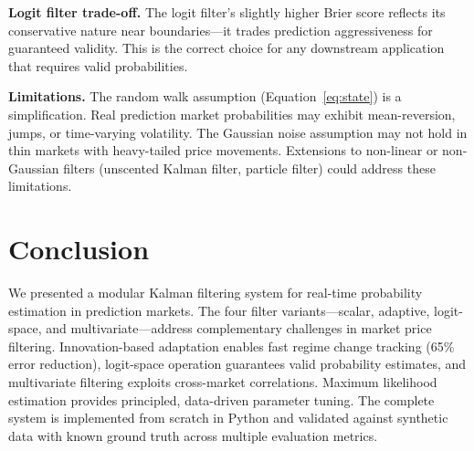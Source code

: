 \documentclass[11pt, a4paper]{article}
\begin{document}
\textbf{Logit filter trade-off.} The logit filter's slightly higher Brier score reflects its conservative nature near boundaries---it trades prediction aggressiveness for guaranteed validity. This is the correct choice for any downstream application that requires valid probabilities.

\textbf{Limitations.} The random walk assumption (Equation~\ref{eq:state}) is a simplification. Real prediction market probabilities may exhibit mean-reversion, jumps, or time-varying volatility. The Gaussian noise assumption may not hold in thin markets with heavy-tailed price movements. Extensions to non-linear or non-Gaussian filters (unscented Kalman filter, particle filter) could address these limitations.

\section{Conclusion}

We presented a modular Kalman filtering system for real-time probability estimation in prediction markets. The four filter variants---scalar, adaptive, logit-space, and multivariate---address complementary challenges in market price filtering. Innovation-based adaptation enables fast regime change tracking (65\% error reduction), logit-space operation guarantees valid probability estimates, and multivariate filtering exploits cross-market correlations. Maximum likelihood estimation provides principled, data-driven parameter tuning. The complete system is implemented from scratch in Python and validated against synthetic data with known ground truth across multiple evaluation metrics.


\end{document}
